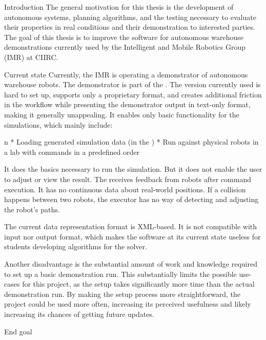 \chap Introduction
The general motivation for this thesis is the development of autonomous systems, planning algorithms, and the testing necessary to evaluate their properties in real conditions and their demonstration to interested parties.
\br
\br
The goal of this thesis is to improve the software for autonomous warehouse demonstrations currently used by the Intelligent and Mobile Robotics Group (IMR) at CIIRC. 

\sec Current state
Currently, the IMR is operating a demonstrator of autonomous warehouse robots. The demonstrator is part of the {\oldRepo}. The version currently used is hard to set up, supports only a proprietary format, and creates additional friction in the workflow while presenting the demonstrator output in text-only format, making it generally unappealing. It enables only basic functionality for the simulations, which mainly include:

\begitems \style n
    * Loading generated simulation data (in the {\oldFormat})
    * Run against physical robots in a lab with commands in a predefined order
\enditems

It does the basics necessary to run the simulation. But it does not enable the user to adjust or view the result. The {\oldRepo} receives feedback from robots after command execution. It has no continuous data about real-world positions. If a collision happens between two robots, the executor has no way of detecting and adjusting the robot's paths.

The current data representation format is XML-based. It is not compatible with {\mapfIR} input nor output format, which makes the software at its current state useless for students developing algorithms for the {\mapfIR} solver. 

Another disadvantage is the substantial amount of work and knowledge required to set up a basic demonstration run. This substantially limits the possible use-cases for this project, as the setup takes significantly more time than the actual demonstration run. By making the setup process more straightforward, the project could be used more often, increasing its perceived usefulness and likely increasing its chances of getting future updates.

\sec End goal

